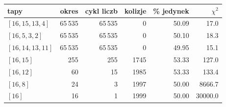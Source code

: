\begin{tabular}{lrrrrr}\toprule
tapy & okres & cykl liczb & kolizje & \% jedynek & $\chi^2$ \\ \midrule
$[16,15,13,4]$ & 65\,535 & 65\,535 & 0 & 50.09 & 17.0 \\
$[16,5,3,2]$ & 65\,535 & 65\,535 & 0 & 50.10 & 18.3 \\
$[16,14,13,11]$ & 65\,535 & 65\,535 & 0 & 49.95 & 15.1 \\
$[16,15]$ & 255 & 255 & 1745 & 53.33 & 127.0 \\
$[16,12]$ & 60 & 15 & 1985 & 53.33 & 133.4 \\
$[16,8]$ & 24 & 3 & 1997 & 50.00 & 8666.7 \\
$[16]$ & 16 & 1 & 1999 & 50.00 & 30000.0 \\
\bottomrule\end{tabular}
